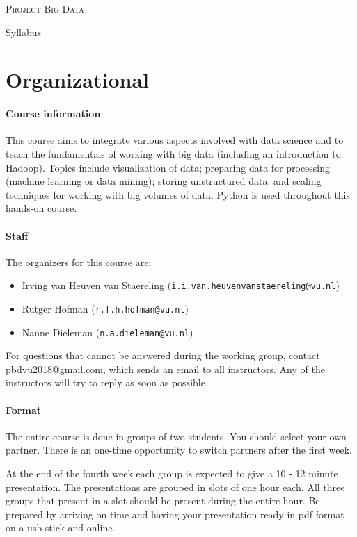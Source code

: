 \documentclass[a4paper]{report}
\newcommand{\blankline}{\par\vspace{5mm}}
\begin{document}
	
\begin{center}
	\textsc{\Large Project Big Data}
	\blankline
	{\large Syllabus}
\end{center}

\section*{Organizational}

\paragraph{Course information}
This course aims to integrate various aspects involved with data science and to teach the fundamentals of working with big data (including an
introduction to Hadoop). Topics include visualization of data; preparing data for processing (machine learning or data mining); storing unstructured data; and scaling techniques for working with big volumes of data. Python is used throughout this hands-on course.

\paragraph{Staff}
The organizers for this course are:
\begin{itemize}
	\setlength\itemsep{0mm}
	\item Irving van Heuven van Staereling (\texttt{i.i.van.heuvenvanstaereling@vu.nl})
	\item Rutger Hofman (\texttt{r.f.h.hofman@vu.nl})
	\item Nanne Dieleman (\texttt{n.a.dieleman@vu.nl})
\end{itemize}
For questions that cannot be answered during the working group, contact pbdvu2018@gmail.com, which sends an email to all instructors. Any of the instructors will try to reply as soon as possible.

\paragraph{Format}
The entire course is done in groups of two students. You should select your own partner. There is an one-time opportunity to switch partners after the first week.

At the end of the fourth week each group is expected to give a 10 - 12 minute presentation. The presentations are grouped in slots of one hour each. All three groups that present in a slot should be present during the entire hour. Be prepared by arriving on time and having your presentation ready in pdf format on a usb-stick and online.
\end{document}
